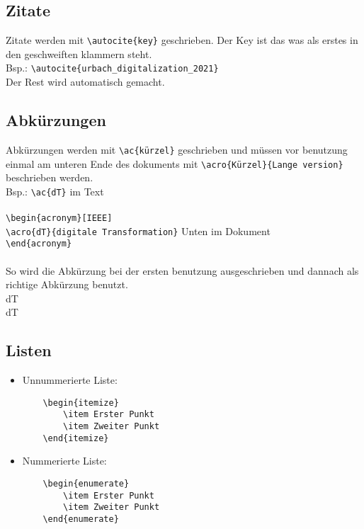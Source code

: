 \documentclass[conference,compsoc,final,a4paper, onecolumn, 11pt]{IEEEtran}
\begin{document}
\subsection{Zitate}
Zitate werden mit \verb|\autocite{key}| geschrieben. 
Der Key ist das was als erstes in den geschweiften klammern steht.\\
Bsp.: \verb|\autocite{urbach_digitalization_2021}| \\
Der Rest wird automatisch gemacht. \autocite{urbach_digitalization_2021}

\subsection{Abkürzungen}
Abkürzungen werden mit \verb|\ac{kürzel}| geschrieben und müssen vor benutzung einmal am unteren Ende des dokuments mit \verb|\acro{Kürzel}{Lange version}| beschrieben werden. \\
Bsp.: \verb|\ac{dT}|  im Text \\\\
\verb|\begin{acronym}[IEEE]| \\
\verb|\acro{dT}{digitale Transformation}|  Unten im Dokument\\
\verb|\end{acronym}| \\\\
So wird die Abkürzung bei der ersten benutzung ausgeschrieben und dannach als richtige Abkürzung benutzt. \\
\ac{dT} \\
\ac{dT}

\subsection{Listen}
\begin{itemize}
    \item Unnummerierte Liste:
    \begin{verbatim}
    \begin{itemize}
        \item Erster Punkt
        \item Zweiter Punkt
    \end{itemize}
    \end{verbatim}
    \item Nummerierte Liste:
    \begin{verbatim}
    \begin{enumerate}
        \item Erster Punkt
        \item Zweiter Punkt
    \end{enumerate}
    \end{verbatim}
\end{itemize}
\end{document}
